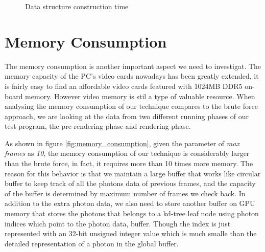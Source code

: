 \begin{figure}[ftp] 
    \centering 
    \renewcommand{\thefigure}{\thechapter.\arabic{figure}}
    \caption[]{Data structure construction time}
    \label{fig:construction_time} 
\end{figure} 

\section{Memory Consumption} 

The memory consumption is another important aspect we need to investigat. The memory capacity of the PC's video cards nowadays has been greatly extended, it is fairly easy to find an affordable video cards featured with 1024MB DDR5 on-board memory. However video memory is stil a type of valuable resource. When analysing the memory consumption of our technique compares to the brute force approach, we are looking at the data from two different running phases of our test program, the pre-rendering phase and rendering phase. 

As shown in figure \ref{fig:memory_consumption}, given the parameter of \emph{max frames} as \emph{10}, the memory consumption of our technique is considerably larger than the brute force, in fact, it requires more than 10 times more memory. The reason for this behavior is that we maintain a large buffer that works like circular buffer to keep track of all the photons data of previous frames, and the capacity of the buffer is determined by maximum number of frames we check back. In addition to the extra photon data, we also need to store another buffer on GPU memory that stores the photons that belongs to a kd-tree leaf node using photon indices which point to the photon data, buffer. Though the index is just represented with an 32-bit unsigned integer value which is much smalle than the detailed representation of a photon in the global buffer. 

